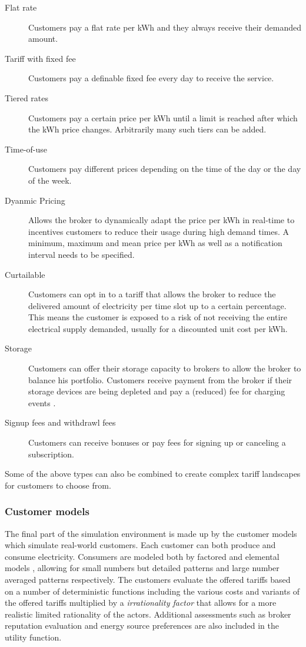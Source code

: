 \begin{description}
	\item[Flat rate] Customers pay a flat rate per kWh and they always receive their demanded amount.
	\item[Tariff with fixed fee] Customers pay a definable fixed fee every day to receive the service. 
	\item [Tiered rates] Customers pay a certain price per kWh until a limit is reached after which the kWh price changes. Arbitrarily many such tiers can be added.
	\item[Time-of-use] Customers pay different prices depending on the time of the day or the day of the week.
	\item[Dyanmic Pricing] Allows the broker to dynamically adapt the price per kWh in real-time to incentives customers to reduce their usage during high demand times. A minimum, maximum and mean price per kWh as well as a notification interval needs to be specified. 
	\item[Curtailable] Customers can opt in to a tariff that allows the broker to reduce the delivered amount of electricity per time slot up to a certain percentage. This means the customer is exposed to a risk of not receiving the entire electrical supply demanded, usually for a discounted unit cost per kWh.
	\item[Storage] Customers can offer their storage capacity to brokers to allow the broker to balance his portfolio. Customers receive payment from the broker if their storage devices are being depleted and pay a (reduced) fee for charging events \citep[p.9]{ketter2018powertac}. 
	\item[Signup fees and withdrawl fees] Customers can receive bonuses or pay fees for signing up or canceling a subscription.
\end{description}

Some of the above types can also be combined to create complex tariff landscapes for customers to choose from. 

\subsubsection{Customer models}%
\label{sub:customer_models}

The final part of the simulation environment is made up by the customer models which simulate real-world customers. Each customer can both produce and consume electricity. Consumers are modeled both by factored and elemental models \citep[p.14]{ketter2018powertac}, allowing for small numbers but detailed patterns and large number averaged patterns respectively. The customers evaluate the offered tariffs based on a number of deterministic functions including the various costs and variants of the offered tariffs multiplied by a \emph{irrationality factor} that allows for a more realistic limited rationality of the actors. Additional assessments such as broker reputation evaluation and energy source preferences are also included in the utility function. 

